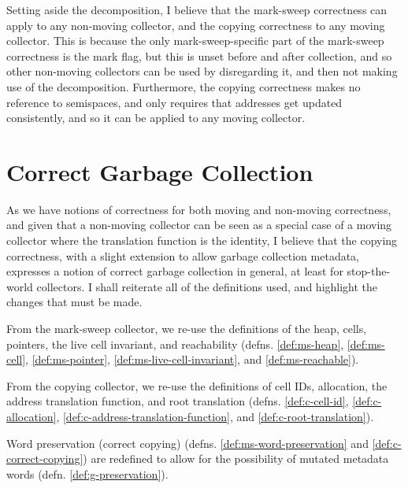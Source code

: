 Setting aside the decomposition, I believe that the mark-sweep
correctness can apply to any non-moving collector, and the copying
correctness to any moving collector. This is because the only
mark-sweep-specific part of the mark-sweep correctness is the mark
flag, but this is unset before and after collection, and so other
non-moving collectors can be used by disregarding it, and then not
making use of the decomposition. Furthermore, the copying correctness
makes no reference to semispaces, and only requires that addresses get
updated consistently, and so it can be applied to any moving
collector.

\section{Correct Garbage Collection}
\label{sec:gc-correct}

As we have notions of correctness for both moving and non-moving
correctness, and given that a non-moving collector can be seen as a
special case of a moving collector where the translation function is
the identity, I believe that the copying correctness, with a slight
extension to allow garbage collection metadata, expresses a notion of
correct garbage collection in general, at least for stop-the-world
collectors. I shall reiterate all of the definitions used, and
highlight the changes that must be made.

From the mark-sweep collector, we re-use the definitions of the heap,
cells, pointers, the live cell invariant, and reachability
(defns. \ref{def:ms-heap}, \ref{def:ms-cell}, \ref{def:ms-pointer},
\ref{def:ms-live-cell-invariant}, and \ref{def:ms-reachable}).

From the copying collector, we re-use the definitions of cell IDs,
allocation, the address translation function, and root translation
(defns. \ref{def:c-cell-id}, \ref{def:c-allocation},
\ref{def:c-address-translation-function}, and
\ref{def:c-root-translation}).

Word preservation (correct copying)
(defns. \ref{def:ms-word-preservation} and
\ref{def:c-correct-copying}) are redefined to allow for the
possibility of mutated metadata words
(defn. \ref{def:g-preservation}).

